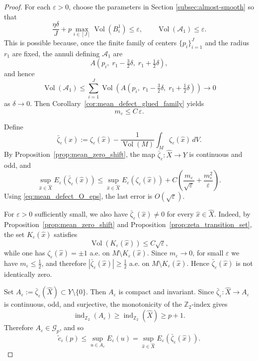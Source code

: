 \documentclass[12pt,english]{article}
\theoremstyle{definition}
\begin{document}
\begin{proof}
For each $\varepsilon>0$, choose the parameters in Section \ref{subsec:almost-smooth} so that
\[
\frac{\eta\delta}{J}+p\max_{i\in[J]}\operatorname{Vol}(B_i^1)\le \varepsilon,
\qquad
\operatorname{Vol}(\mathcal A_1)\le \varepsilon.
\]
This is possible because, once the finite family of centers $\{p_i\}_{i=1}^J$ and the radius
$r_1$ are fixed, the annuli defining $\mathcal A_1$ are
\[
A\!\left(p_i,\;r_1-\tfrac32\delta,\;r_1+\tfrac12\delta\right),
\]
and hence
\[
\operatorname{Vol}(\mathcal A_1)\le
\sum_{i=1}^J
\operatorname{Vol}\!\left(A\!\left(p_i,\;r_1-\tfrac32\delta,\;r_1+\tfrac12\delta\right)\right)\to 0
\]
as $\delta\to 0$. Then Corollary~\ref{cor:mean_defect_glued_family} yields
\begin{equation}\label{eq:mean_defect_O_eps}
m_\varepsilon
\le C\,\varepsilon.
\end{equation}

Define
\[
\bar\zeta_\varepsilon(\hat x)
:=
\zeta_\varepsilon(\hat x)
-
\frac{1}{\operatorname{Vol}(M)}\int_M \zeta_\varepsilon(\hat x)\,dV.
\]
By Proposition~\ref{prop:mean_zero_shift}, the map $ \bar\zeta_\varepsilon:\widehat X\to Y$ is continuous and odd, and
\begin{equation}\label{eq:energy_after_mean_zero_shift}
\sup_{\hat x\in\widehat X} E_\varepsilon(\bar\zeta_\varepsilon(\hat x))
\le
\sup_{\hat x\in\widehat X} E_\varepsilon(\zeta_\varepsilon(\hat x))
+
C\left(\frac{m_\varepsilon}{\sqrt{\varepsilon}}+\frac{m_\varepsilon^2}{\varepsilon}\right).
\end{equation}
Using \eqref{eq:mean_defect_O_eps}, the last error is $O(\sqrt{\varepsilon})$.

For $\varepsilon>0$ sufficiently small, we also have $\bar\zeta_\varepsilon(\hat x)\neq 0$ for every
$\hat x\in\widehat X$. Indeed, by Proposition~\ref{prop:mean_zero_shift}
and Proposition~\ref{prop:zeta_transition_set}, the set $K_\varepsilon(\hat x)$ satisfies
\[
\operatorname{Vol}(K_\varepsilon(\hat x))\le C\sqrt{\varepsilon},
\]
while one has $\zeta_\varepsilon(\hat x)=\pm1$ a.e. on $M\setminus K_\varepsilon(\hat x)$. Since $m_\varepsilon\to 0$, for small $\varepsilon$ we have $m_\varepsilon\le \frac12$, and therefore $ |\bar\zeta_\varepsilon(\hat x)|\ge \frac12$ a.e. on $M\setminus K_\varepsilon(\hat x)$. Hence $\bar\zeta_\varepsilon(\hat x)$ is not identically zero.

Set $A_\varepsilon:=\bar\zeta_\varepsilon(\widehat X)\subset Y\setminus\{0\}$. Then $A_\varepsilon$ is compact and invariant. Since $ \bar\zeta_\varepsilon:\widehat X\to A_\varepsilon$ is continuous, odd, and surjective, the monotonicity of the $\mathbb{Z}_2$-index gives
\[
\operatorname{ind}_{\mathbb{Z}_2}(A_\varepsilon)\ge \operatorname{ind}_{\mathbb{Z}_2}(\widehat X)\ge p+1.
\]
Therefore $A_\varepsilon\in\mathcal G_p$, and so
\[
\tilde c_\varepsilon(p)
\le
\sup_{u\in A_\varepsilon}E_\varepsilon(u)
=
\sup_{\hat x\in\widehat X}E_\varepsilon(\bar\zeta_\varepsilon(\hat x)).
\]


\end{proof}
\end{document}
